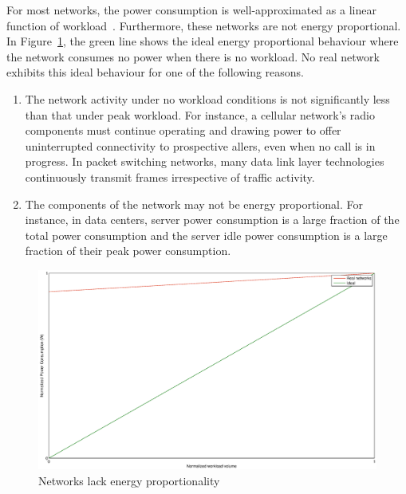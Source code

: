 For most networks, the power consumption is well-approximated as a linear function of workload~\cite{Peng:2011:TPS:2030613.2030628,Fan:power:ICSA:2007}. Furthermore, these networks are not energy proportional. In Figure~\ref{fig:ener-prop}, the green line shows the ideal energy proportional behaviour where the network consumes no power when there is no workload. No real network exhibits this ideal behaviour for one of the following reasons. 
\begin{enumerate}
\item The network activity under no workload conditions is not significantly less than that under peak workload. For instance, a cellular network's radio components must continue operating and drawing power to offer uninterrupted connectivity to prospective allers, even when no call is in progress. In packet switching networks, many data link layer technologies continuously transmit frames irrespective of traffic activity. 
\item The components of the network may not be energy proportional. For instance, in data centers, server power consumption is a large fraction of the total power consumption and the server idle power consumption is a large fraction of their peak power consumption. 
\end{enumerate}

\begin{figure}
\includegraphics[width=1\textwidth]{pics/enerprop.eps}
\caption{Networks lack energy proportionality}
\label{fig:ener-prop}
\end{figure} 

